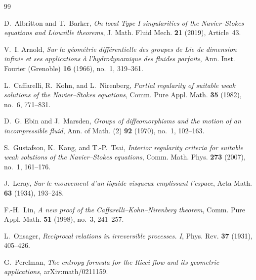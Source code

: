 \documentclass[11pt]{amsart}
\numberwithin{equation}{section}
\theoremstyle{plain}
\theoremstyle{definition}
\theoremstyle{remark}
\begin{document}
\begin{thebibliography}{99}

D.~Albritton and T.~Barker,
\emph{On local Type I singularities of the Navier--Stokes equations and
Liouville theorems},
J. Math. Fluid Mech. \textbf{21} (2019), Article~43.

V.~I. Arnold,
\emph{Sur la g\'eom\'etrie diff\'erentielle des groupes de Lie de dimension
infinie et ses applications \`a l'hydrodynamique des fluides parfaits},
Ann. Inst. Fourier (Grenoble) \textbf{16} (1966), no.~1, 319--361.

L.~Caffarelli, R.~Kohn, and L.~Nirenberg,
\emph{Partial regularity of suitable weak solutions of the Navier--Stokes
equations}, Comm. Pure Appl. Math. \textbf{35} (1982), no.~6, 771--831.

D.~G. Ebin and J.~Marsden,
\emph{Groups of diffeomorphisms and the motion of an incompressible fluid},
Ann. of Math. (2) \textbf{92} (1970), no.~1, 102--163.

S.~Gustafson, K.~Kang, and T.-P.~Tsai,
\emph{Interior regularity criteria for suitable weak solutions of the
Navier--Stokes equations},
Comm. Math. Phys. \textbf{273} (2007), no.~1, 161--176.

J.~Leray,
\emph{Sur le mouvement d'un liquide visqueux emplissant l'espace},
Acta Math. \textbf{63} (1934), 193--248.

F.-H.~Lin,
\emph{A new proof of the Caffarelli--Kohn--Nirenberg theorem},
Comm. Pure Appl. Math. \textbf{51} (1998), no.~3, 241--257.

L.~Onsager,
\emph{Reciprocal relations in irreversible processes. I},
Phys. Rev. \textbf{37} (1931), 405--426.

G.~Perelman,
\emph{The entropy formula for the Ricci flow and its geometric applications},
arXiv:math/0211159.

\end{thebibliography}
\end{document}
